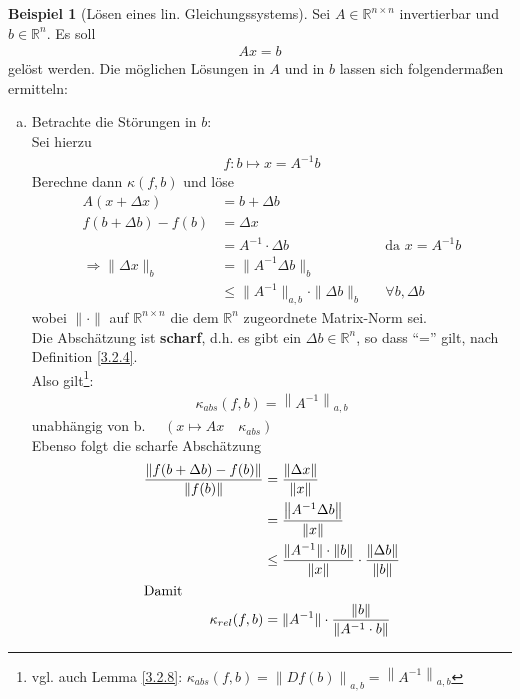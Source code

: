 \documentclass[ngerman,fontsize=11pt, paper=a4, parskip=half, titlepage=true, toc=bib]{scrbook}
\theoremstyle{definition}
\newtheorem{Bsp}[Def]{Beispiel}
\theoremstyle{plain}
\newcommand{\R}{\mathds{R}}
\newcommand{\Ren}{\mathds{R}^{n}}
\newcommand{\Renn}{\mathds{R}^{n\times n}}
\newcommand{\nn}[1]{\left\| #1 \right\|}
\newcommand{\subsectione}[1]{\addtocounter{Def}{1}\subsection{#1}}
\newenvironment{Bspe}[1][]{ %
	\begin{Bsp}[#1]
	}
	{
	\end{Bsp}
	\addtocounter{subsection}{1}
}
\begin{document}
\begin{Bspe}[Lösen eines lin. Gleichungssystems]
	\label{3.2.10}
	Sei $A\in \R^{n\times n}$ invertierbar und $b\in \R^n$. Es soll 
	\begin{gather*}
	Ax =b
	\end{gather*}
	gelöst werden.
	Die möglichen Lösungen in $A$ und in $b$ lassen sich folgendermaßen ermitteln:
	\begin{enumerate}[a)]
		\item Betrachte die Störungen in $b$:\\
		Sei hierzu
		\begin{gather*}
		f: b\mapsto x= A^{-1}b 
		\end{gather*}
		Berechne dann $ \kappa(f,b)$ und löse 
		\begin{align*}
		A(x + \Delta x) &= b+\Delta b \\
		f(b + \Delta b) - f(b) &= \Delta x \\
		&= A^{-1} \cdot \Delta b && \text{da }x = A^{-1}b \\
		\Rightarrow \|\Delta x\|_{b}  &= \|A^{-1}\Delta b\|_{b} \\
		&\leq \|A^{-1}\|_{a,b}\cdot \|\Delta b\|_{b} && \forall b, \Delta b 
		\end{align*}
		wobei $\|\cdot\| $ auf $\Renn$ die dem $\Ren$ zugeordnete Matrix-Norm sei. \\
		Die Abschätzung ist \textbf{scharf}, 
		d.h. es gibt ein $\Delta b\in \R^n$, so dass \enquote{=} gilt, 
		nach Definition \ref{3.2.4}. \\
		Also gilt\footnote{vgl. auch Lemma \ref{3.2.8}: $\kappa_{abs}(f,b)=\nn{Df(b)}_{a,b}=\nn{A^{-1}}_{a,b}$}:
		\begin{gather}
		\kappa_{abs}(f,b) = \nn{A^{-1}}_{a,b} \label{III.2.6}
		\end{gather}
		unabhängig von b.  $ \quad \left( x\mapsto Ax \quad \kappa_{abs}\right)$\\
		Ebenso folgt die scharfe Abschätzung 
		\begin{align}
		\nonumber
		\frac{\|	f(b + \Delta b) - f(b)\|}{\|f(b)\|} &= \frac{\nn{\Delta x}}{\nn{x}}\\ \nonumber
		& = \frac{\nn{A^{-1}\Delta b}}{\nn{x}} \\ \nonumber
		& \leq  \frac{\|A^{-1}\|\cdot \|b\|}{\|x\|} \cdot \frac{\|\Delta b\|}{\|b\|} \\
		\intertext{Damit}
		\kappa_{rel} (f,b) &= \|A^{-1} \| \cdot \frac{\|b\|}{\|A^{-1}\cdot b\|} \label{III.2.7}

\end{align}
\end{enumerate}
\end{Bspe}
\end{document}
